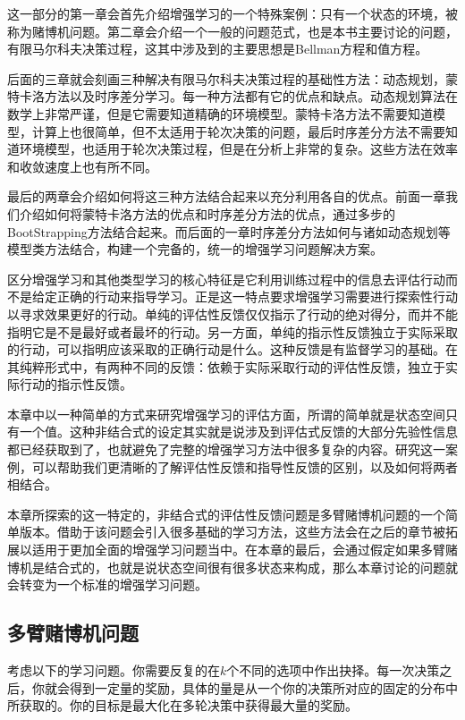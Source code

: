 \documentclass{ctexart}
\begin{document}
        这一部分的第一章会首先介绍增强学习的一个特殊案例：只有一个状态的环境，被称为赌博机问题。第二章会介绍一个一般的问题范式，也是本书主要讨论的问题，有限马尔科夫决策过程，这其中涉及到的主要思想是Bellman方程和值方程。

        后面的三章就会刻画三种解决有限马尔科夫决策过程的基础性方法：动态规划，蒙特卡洛方法以及时序差分学习。每一种方法都有它的优点和缺点。动态规划算法在数学上非常严谨，但是它需要知道精确的环境模型。蒙特卡洛方法不需要知道模型，计算上也很简单，但不太适用于轮次决策的问题，最后时序差分方法不需要知道环境模型，也适用于轮次决策过程，但是在分析上非常的复杂。这些方法在效率和收敛速度上也有所不同。

        最后的两章会介绍如何将这三种方法结合起来以充分利用各自的优点。前面一章我们介绍如何将蒙特卡洛方法的优点和时序差分方法的优点，通过多步的BootStrapping方法结合起来。而后面的一章时序差分方法如何与诸如动态规划等模型类方法结合，构建一个完备的，统一的增强学习问题解决方案。

        区分增强学习和其他类型学习的核心特征是它利用训练过程中的信息去评估行动而不是给定正确的行动来指导学习。正是这一特点要求增强学习需要进行探索性行动以寻求效果更好的行动。单纯的评估性反馈仅仅指示了行动的绝对得分，而并不能指明它是不是最好或者最坏的行动。另一方面，单纯的指示性反馈独立于实际采取的行动，可以指明应该采取的正确行动是什么。这种反馈是有监督学习的基础。在其纯粹形式中，有两种不同的反馈：依赖于实际采取行动的评估性反馈，独立于实际行动的指示性反馈。

        本章中以一种简单的方式来研究增强学习的评估方面，所谓的简单就是状态空间只有一个值。这种非结合式的设定其实就是说涉及到评估式反馈的大部分先验性信息都已经获取到了，也就避免了完整的增强学习方法中很多复杂的内容。研究这一案例，可以帮助我们更清晰的了解评估性反馈和指导性反馈的区别，以及如何将两者相结合。

        本章所探索的这一特定的，非结合式的评估性反馈问题是多臂赌博机问题的一个简单版本。借助于该问题会引入很多基础的学习方法，这些方法会在之后的章节被拓展以适用于更加全面的增强学习问题当中。在本章的最后，会通过假定如果多臂赌博机是结合式的，也就是说状态空间很有很多状态来构成，那么本章讨论的问题就会转变为一个标准的增强学习问题。

        \subsection{多臂赌博机问题}
            考虑以下的学习问题。你需要反复的在$k$个不同的选项中作出抉择。每一次决策之后，你就会得到一定量的奖励，具体的量是从一个你的决策所对应的固定的分布中所获取的。你的目标是最大化在多轮决策中获得最大量的奖励。
\end{document}
